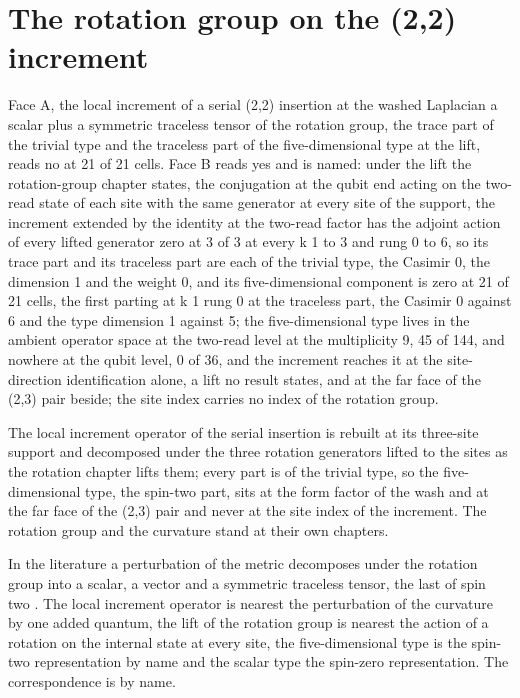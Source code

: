\section{The rotation group on the (2,2) increment}\label{mod:X-0-D542242-w-rgin}
\begin{chwall}
Face A, the local increment of a serial (2,2) insertion at the washed Laplacian a scalar plus a symmetric traceless tensor of the rotation group, the trace part of the trivial type and the traceless part of the five-dimensional type at the lift, reads no at 21 of 21 cells. Face B reads yes and is named: under the lift the rotation-group chapter states, the conjugation at the qubit end acting on the two-read state of each site with the same generator at every site of the support, the increment extended by the identity at the two-read factor has the adjoint action of every lifted generator zero at 3 of 3 at every k 1 to 3 and rung 0 to 6, so its trace part and its traceless part are each of the trivial type, the Casimir 0, the dimension 1 and the weight 0, and its five-dimensional component is zero at 21 of 21 cells, the first parting at k 1 rung 0 at the traceless part, the Casimir 0 against 6 and the type dimension 1 against 5; the five-dimensional type lives in the ambient operator space at the two-read level at the multiplicity 9, 45 of 144, and nowhere at the qubit level, 0 of 36, and the increment reaches it at the site-direction identification alone, a lift no result states, and at the far face of the (2,3) pair beside; the site index carries no index of the rotation group.
\end{chwall}
\chdeps{}{}
The local increment operator of the serial insertion is rebuilt at its three-site support and decomposed under the three rotation generators lifted to the sites as the rotation chapter lifts them; every part is of the trivial type, so the five-dimensional type, the spin-two part, sits at the form factor of the wash and at the far face of the (2,3) pair and never at the site index of the increment. The rotation group and the curvature stand at their own chapters.
\begin{chbridge}
In the literature a perturbation of the metric decomposes under the rotation group into a scalar, a vector and a symmetric traceless tensor, the last of spin two \cite{Weinberg1995,Wald1984}. The local increment operator is nearest the perturbation of the curvature by one added quantum, the lift of the rotation group is nearest the action of a rotation on the internal state at every site, the five-dimensional type is the spin-two representation by name and the scalar type the spin-zero representation. The correspondence is by name.
\end{chbridge}
